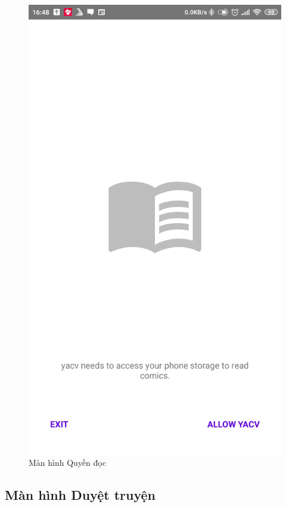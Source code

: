 \documentclass[../../thesis]{subfiles}
\begin{document}
\begin{figure}[H]
    \centering
    \includegraphics[scale=0.12]{../images/Screenshot_2021-05-25-08-05-43-397_com.uet.nvmnghia.yacv}
    \caption{Màn hình Quyền đọc}
    \label{fig:permission_screen}
\end{figure}

\subsection{Màn hình Duyệt truyện}
\end{document}
